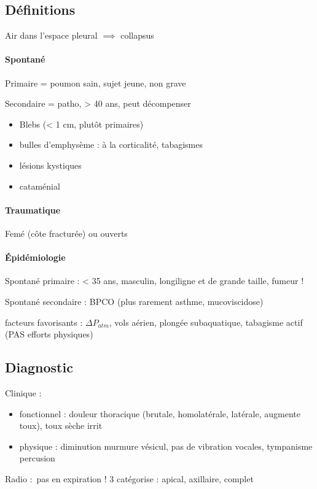 \subsection{Définitions}
Air dans l'espace pleural $\implies$ collapsus 

\paragraph{Spontané}
Primaire = poumon sain, sujet jeune, non grave

Secondaire = patho, > 40 ans, peut décompenser

\begin{itemize}
  \item Blebs (< 1 cm, plutôt primaires)
  \item bulles d'emphysème : à la corticalité, tabagismes
  \item lésions kystiques
  \item cataménial
\end{itemize}

\paragraph{Traumatique}
Femé (côte fracturée) ou ouverts

\paragraph{Épidémiologie}
Spontané primaire : < 35 ans, masculin, longiligne et de grande taille, fumeur !

Spontané secondaire : BPCO (plus rarement asthme, mucoviscidose)

facteurs favorisants : $\Delta P_{atm}$, vols aérien, plongée subaquatique,
tabagisme actif (PAS
efforts physiques)

\subsection{Diagnostic}
Clinique : 
\begin{itemize}
  \item fonctionnel : douleur thoracique (brutale, homolatérale, latérale,
    augmente toux), toux sèche irrit
  \item physique : diminution murmure vésicul, pas de vibration vocales,
    tympanisme percusion
\end{itemize}
Radio : pas en expiration ! 3 catégorise : apical, axillaire, complet

